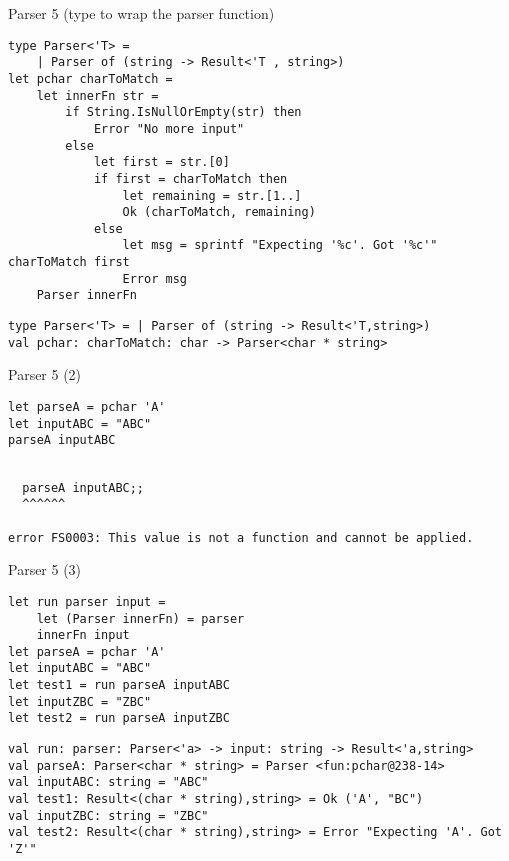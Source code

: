 \documentclass[t]{beamer}
\begin{document}
\begin{frame}[label={sec:org5b296fc},fragile]{Parser 5 (type to wrap the parser function)}
 \begin{verbatim}
type Parser<'T> =
    | Parser of (string -> Result<'T , string>)
let pchar charToMatch = 
    let innerFn str =
        if String.IsNullOrEmpty(str) then
            Error "No more input"
        else
            let first = str.[0] 
            if first = charToMatch then
                let remaining = str.[1..]
                Ok (charToMatch, remaining)
            else
                let msg = sprintf "Expecting '%c'. Got '%c'" charToMatch first
                Error msg
    Parser innerFn
\end{verbatim}

\begin{verbatim}
type Parser<'T> = | Parser of (string -> Result<'T,string>)
val pchar: charToMatch: char -> Parser<char * string>
\end{verbatim}
\end{frame}

\begin{frame}[label={sec:orgea80157},fragile]{Parser 5 (2)}
 \begin{verbatim}
let parseA = pchar 'A'
let inputABC = "ABC"
parseA inputABC
\end{verbatim}

\begin{verbatim}

  parseA inputABC;;
  ^^^^^^

error FS0003: This value is not a function and cannot be applied.
\end{verbatim}
\end{frame}

\begin{frame}[label={sec:org499de12},fragile]{Parser 5 (3)}
 \begin{verbatim}
let run parser input = 
    let (Parser innerFn) = parser 
    innerFn input
let parseA = pchar 'A' 
let inputABC = "ABC"
let test1 = run parseA inputABC
let inputZBC = "ZBC"
let test2 = run parseA inputZBC
\end{verbatim}

\begin{verbatim}
val run: parser: Parser<'a> -> input: string -> Result<'a,string>
val parseA: Parser<char * string> = Parser <fun:pchar@238-14>
val inputABC: string = "ABC"
val test1: Result<(char * string),string> = Ok ('A', "BC")
val inputZBC: string = "ZBC"
val test2: Result<(char * string),string> = Error "Expecting 'A'. Got 'Z'"
\end{verbatim}
\end{frame}
\end{document}
